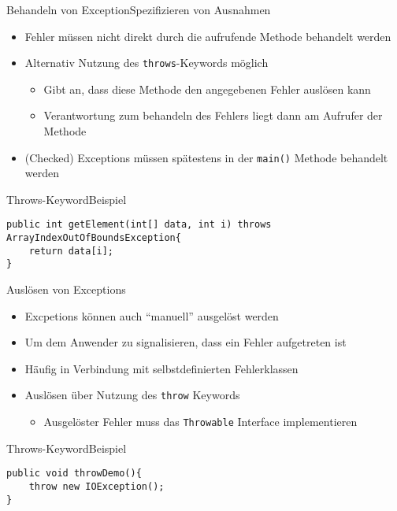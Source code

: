 \begin{frame}{Behandeln von Exception}{Spezifizieren von Ausnahmen}
\begin{itemize}[<+->]
    \item Fehler müssen nicht direkt durch die aufrufende Methode behandelt werden
    \item Alternativ Nutzung des \texttt{throws}-Keywords möglich
    \begin{itemize}
        \item Gibt an, dass diese Methode den angegebenen Fehler auslösen kann
        \item Verantwortung zum behandeln des Fehlers liegt dann am Aufrufer der Methode
    \end{itemize}
    \item (Checked) Exceptions müssen spätestens in der \texttt{main()} Methode behandelt werden
\end{itemize}
\end{frame}

\begin{frame}[fragile]{Throws-Keyword}{Beispiel}
\lstset{style=java}
\begin{lstlisting}
public int getElement(int[] data, int i) throws ArrayIndexOutOfBoundsException{
    return data[i];
}
\end{lstlisting}
\end{frame}

\begin{frame}{Auslösen von Exceptions}{}
    \begin{itemize}
        \item Excpetions können auch "`manuell"' ausgelöst werden
        \item Um dem Anwender zu signalisieren, dass ein Fehler aufgetreten ist
        \item Häufig in Verbindung mit selbstdefinierten Fehlerklassen
        \item Auslösen über Nutzung des \texttt{throw} Keywords
        \begin{itemize}
            \item Ausgelöster Fehler muss das \texttt{Throwable} Interface implementieren
        \end{itemize}
    \end{itemize}
\end{frame}

\begin{frame}[fragile]{Throws-Keyword}{Beispiel}
\lstset{style=java}
\begin{lstlisting}
public void throwDemo(){
    throw new IOException();
}
\end{lstlisting}
\end{frame}

